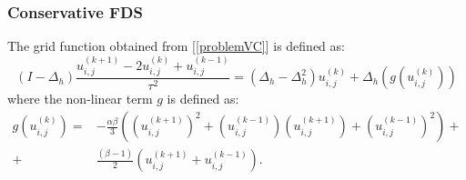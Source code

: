 \documentclass{beamer}
\begin{document}

\begin{frame}
\frametitle{Conservative FDS}
The grid function obtained from [\ref{problemVC}] is defined as:
\begin{equation}
(I-\Delta_h)\frac{ u^{(k+1)}_{i, j} - 2u^{(k)}_{i,j} + u^{(k-1)}_{i,j} }{\tau^2} = (\Delta_h - \Delta_h^2)u^{(k)}_{i,j} + \Delta_h(g(u^{(k)}_{i,j}))
\end{equation}
%
where the non-linear term $g$ is defined as:
\begin{align}
g(u^{(k)}_{i,j})=& -\frac{\alpha \beta} { 3 } \left( (u^{(k+1)}_{i,j})^2 + (u^{(k-1)}_{i,j})(u^{(k+1)}_{i,j}) + (u^{(k-1)}_{i,j})^2 \right) + \nonumber\\
+&\frac{ (\beta - 1 )}{ 2 }\left( u^{(k+1)}_{i,j} + u^{(k-1)}_{i,j} \right).
\end{align}


\end{frame}


\end{document}
